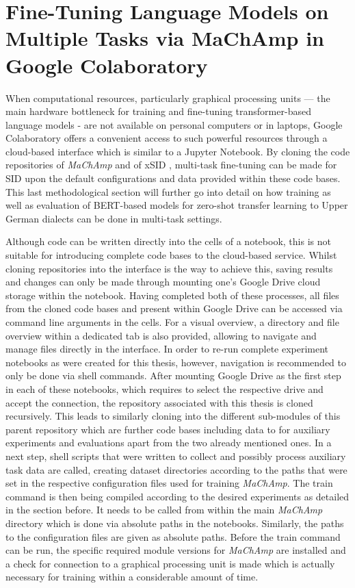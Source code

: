 \documentclass[11pt,a4paper,twoside,openright]{scrbook}
\begin{document}
\section{Fine-Tuning Language Models on Multiple Tasks via MaChAmp in Google Colaboratory}

When computational resources, particularly graphical processing units — the main hardware bottleneck for training and fine-tuning transformer-based language models - are not available on personal computers or in laptops, Google Colaboratory offers a convenient access to such powerful resources through a cloud-based interface which is similar to a Jupyter Notebook. By cloning the code repositories of \textit{MaChAmp} \citep{van-der-goot-etal-2021-massive} and of xSID \citep{van-der-goot-etal-2021-masked}, multi-task fine-tuning can be made for SID upon the default configurations and data provided within these code bases. This last methodological section will further go into detail on how training as well as evaluation of BERT-based models for zero-shot transfer learning to Upper German dialects can be done in multi-task settings.

Although code can be written directly into the cells of a notebook, this is not suitable for introducing complete code bases to the cloud-based service. Whilst cloning repositories into the interface is the way to achieve this, saving results and changes can only be made through mounting one's Google Drive cloud storage within the notebook. Having completed both of these processes, all files from the cloned code bases and present within Google Drive can be accessed via command line arguments in the cells. For a visual overview, a directory and file overview within a dedicated tab is also provided, allowing to navigate and manage files directly in the interface. In order to re-run complete experiment notebooks as were created for this thesis, however, navigation is recommended to only be done via shell commands. After mounting Google Drive as the first step in each of these notebooks, which requires to select the respective drive and accept the connection, the repository associated with this thesis is cloned recursively. This leads to similarly cloning into the different sub-modules of this parent repository which are further code bases including data to for auxiliary experiments and evaluations apart from the two already mentioned ones. In a next step, shell scripts that were written to collect and possibly process auxiliary task data are called, creating dataset directories according to the paths that were set in the respective configuration files used for training \textit{MaChAmp}. The train command is then being compiled according to the desired experiments as detailed in the section before. It needs to be called from within the main \textit{MaChAmp} directory which is done via absolute paths in the notebooks. Similarly, the paths to the configuration files are given as absolute paths. Before the train command can be run, the specific required module versions for \textit{MaChAmp} are installed and a check for connection to a graphical processing unit is made which is actually necessary for training within a considerable amount of time. 
\end{document}
